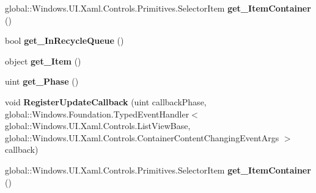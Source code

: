 \begin{DoxyCompactItemize}
global\+::\+Windows.\+U\+I.\+Xaml.\+Controls.\+Primitives.\+Selector\+Item {\bfseries get\+\_\+\+Item\+Container} ()
\item 
\mbox{\label{interface_windows_1_1_u_i_1_1_xaml_1_1_controls_1_1_i_container_content_changing_event_args_a4d50cd4c2e41b7824eb299ae3a98881b}} 
bool {\bfseries get\+\_\+\+In\+Recycle\+Queue} ()
\item 
\mbox{\label{interface_windows_1_1_u_i_1_1_xaml_1_1_controls_1_1_i_container_content_changing_event_args_a10ddd7510b58dc1746dc1d24aa4f40ae}} 
object {\bfseries get\+\_\+\+Item} ()
\item 
\mbox{\label{interface_windows_1_1_u_i_1_1_xaml_1_1_controls_1_1_i_container_content_changing_event_args_a738ad9fa4dbda62eecb572e7177f20c5}} 
uint {\bfseries get\+\_\+\+Phase} ()
\item 
\mbox{\label{interface_windows_1_1_u_i_1_1_xaml_1_1_controls_1_1_i_container_content_changing_event_args_a667cd37ef9c242308e80a5eeb302226a}} 
void {\bfseries Register\+Update\+Callback} (uint callback\+Phase, global\+::\+Windows.\+Foundation.\+Typed\+Event\+Handler$<$ global\+::\+Windows.\+U\+I.\+Xaml.\+Controls.\+List\+View\+Base, global\+::\+Windows.\+U\+I.\+Xaml.\+Controls.\+Container\+Content\+Changing\+Event\+Args $>$ callback)
\item 
\mbox{\label{interface_windows_1_1_u_i_1_1_xaml_1_1_controls_1_1_i_container_content_changing_event_args_acbc05dfed05ddf98a734f2dfef63244c}} 
global\+::\+Windows.\+U\+I.\+Xaml.\+Controls.\+Primitives.\+Selector\+Item {\bfseries get\+\_\+\+Item\+Container} ()
\item 
\mbox{\label{interface_windows_1_1_u_i_1_1_xaml_1_1_controls_1_1_i_container_content_changing_event_args_a4d50cd4c2e41b7824eb299ae3a98881b}} 

\end{DoxyCompactItemize}
